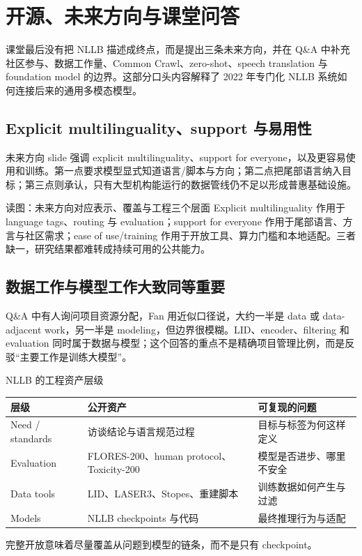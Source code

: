 \section{开源、未来方向与课堂问答}

课堂最后没有把 NLLB 描述成终点，而是提出三条未来方向，并在 Q\&A 中补充社区参与、数据工作量、Common Crawl、zero-shot、speech translation 与 foundation model 的边界。这部分口头内容解释了 2022 年专门化 NLLB 系统如何连接后来的通用多模态模型。

\subsection{Explicit multilinguality、support 与易用性}

未来方向 slide 强调 explicit multilinguality、support for everyone，以及更容易使用和训练。第一点要求模型显式知道语言/脚本与方向；第二点把尾部语言纳入目标；第三点则承认，只有大型机构能运行的数据管线仍不足以形成普惠基础设施。


\begin{knowledgebox}{读图：未来方向对应表示、覆盖与工程三个层面}
Explicit multilinguality 作用于 language tags、routing 与 evaluation；support for everyone 作用于尾部语言、方言与社区需求；ease of use/training 作用于开放工具、算力门槛和本地适配。三者缺一，研究结果都难转成持续可用的公共能力。
\end{knowledgebox}


\subsection{数据工作与模型工作大致同等重要}

Q\&A 中有人询问项目资源分配，Fan 用近似口径说，大约一半是 data 或 data-adjacent work，另一半是 modeling，但边界很模糊。LID、encoder、filtering 和 evaluation 同时属于数据与模型；这个回答的重点不是精确项目管理比例，而是反驳“主要工作是训练大模型”。

\begin{importantbox}{NLLB 的工程资产层级}
\begin{tabularx}{\textwidth}{@{}L{0.2\textwidth}L{0.29\textwidth}X@{}}
\toprule
层级 & 公开资产 & 可复现的问题 \\
\midrule
Need / standards & 访谈结论与语言规范过程 & 目标与标签为何这样定义 \\
Evaluation & FLORES-200、human protocol、Toxicity-200 & 模型是否进步、哪里不安全 \\
Data tools & LID、LASER3、Stopes、重建脚本 & 训练数据如何产生与过滤 \\
Models & NLLB checkpoints 与代码 & 最终推理行为与适配 \\
\bottomrule
\end{tabularx}
完整开放意味着尽量覆盖从问题到模型的链条，而不是只有 checkpoint。
\end{importantbox}

